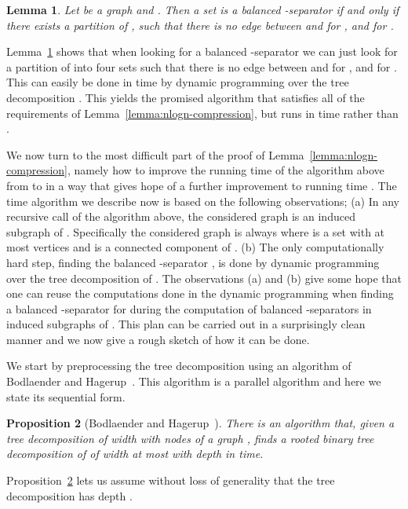 \documentclass[a4paper,11pt]{article}
\newtheorem{lemma}{Lemma}[section]
\newtheorem{proposition}[lemma]{Proposition}
\theoremstyle{definition}
\theoremstyle{remark}
\begin{document}
\begin{lemma}\label{lem:balanced-3coloring}
  Let  be a graph and .  Then a set  is a balanced
  -separator if and only if there exists a partition
   of , such that there is no edge
  between  and  for , and 
  for .
\end{lemma}
Lemma~\ref{lem:balanced-3coloring} shows that when looking for a
balanced -separator we can just look for a partition of  into
four sets  such that there is no edge between  and
 for , and  for .  This
can easily be done in time  by dynamic programming over the
tree decomposition .  This yields the promised algorithm
that satisfies all of the requirements of
Lemma~\ref{lemma:nlogn-compression}, but runs in time 
rather than .

\medskip We now turn to the most difficult part of the proof of
Lemma~\ref{lemma:nlogn-compression}, namely how to improve the running
time of the algorithm above from  to  in a
way that gives hope of a further improvement to running time
.  The  time algorithm we describe now is
based on the following observations; (a) In any recursive call of the
algorithm above, the considered graph is an induced subgraph of .
Specifically the considered graph is always  where  is
a set with at most  vertices and  is a connected component of
.  (b) The only computationally hard step, finding the
balanced -separator , is done by dynamic programming over the
tree decomposition  of .  The observations (a) and (b)
give some hope that one can reuse the computations done in the dynamic
programming when finding a balanced -separator for  during the
computation of balanced -separators in induced subgraphs of .
This plan can be carried out in a surprisingly clean manner and we now
give a rough sketch of how it can be done.

We start by preprocessing the tree decomposition using an algorithm of
Bodlaender and Hagerup~\cite{BodlaenderH98}.  This algorithm is a
parallel algorithm and here we state its sequential form.
\begin{proposition}[Bodlaender and Hagerup~\cite{BodlaenderH98}]
  \label{proposition:parallel}
  There is an algorithm that, given a tree decomposition of width 
  with  nodes of a graph , finds a rooted binary tree
  decomposition of  of width at most  with depth 
  in  time.
\end{proposition}
Proposition~\ref{proposition:parallel} lets us assume without loss of
generality that the tree decomposition  has depth .
\end{document}
